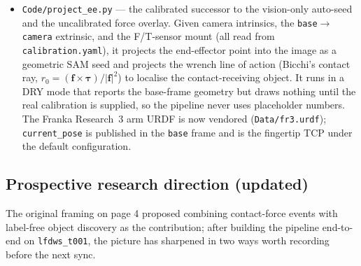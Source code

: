 \documentclass[11pt]{article}
\begin{document}
\begin{itemize}[noitemsep]
        (\texttt{Docs/reports/report\_<trial>.pdf}) containing the summary
        table, the event list, the press-frame sidecar excerpt, and every
        figure produced by the pipeline. Intended as the one document to
        share per future bag.
  \item \texttt{Code/project\_ee.py} --- the calibrated successor to the
        vision-only auto-seed and the uncalibrated force overlay. Given
        camera intrinsics, the \texttt{base}$\to$\texttt{camera} extrinsic,
        and the F/T-sensor mount (all read from \texttt{calibration.yaml}),
        it projects the end-effector point into the image as a geometric
        SAM seed and projects the wrench line of action (Bicchi's contact
        ray, $r_0 = (\mathbf{f}\times\boldsymbol{\tau})/|\mathbf{f}|^2$) to
        localise the contact-receiving object. It runs in a DRY mode that
        reports the base-frame geometry but draws nothing until the real
        calibration is supplied, so the pipeline never uses placeholder
        numbers. The Franka Research~3 arm URDF is now vendored
        (\texttt{Data/fr3.urdf}); \texttt{current\_pose} is published in the
        \texttt{base} frame and is the fingertip TCP under the default
        configuration.
\end{itemize}

\subsection{Prospective research direction (updated)}

The original framing on page 4 proposed combining contact-force events
with label-free object discovery as the contribution; after building the
pipeline end-to-end on \texttt{lfdws\_t001}, the picture has sharpened in
two ways worth recording before the next sync.
\end{document}
